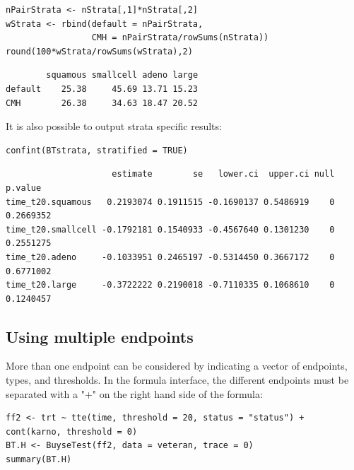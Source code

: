 \documentclass[12pt]{article}
\begin{document}
\lstset{language=r,label= ,caption= ,captionpos=b,numbers=none}
\begin{lstlisting}
nPairStrata <- nStrata[,1]*nStrata[,2]
wStrata <- rbind(default = nPairStrata,
                 CMH = nPairStrata/rowSums(nStrata)) 
round(100*wStrata/rowSums(wStrata),2)
\end{lstlisting}

\begin{verbatim}
        squamous smallcell adeno large
default    25.38     45.69 13.71 15.23
CMH        26.38     34.63 18.47 20.52
\end{verbatim}


It is also possible to output strata specific results:
\lstset{language=r,label= ,caption= ,captionpos=b,numbers=none}
\begin{lstlisting}
confint(BTstrata, stratified = TRUE)
\end{lstlisting}

\begin{verbatim}
                     estimate        se   lower.ci  upper.ci null   p.value
time_t20.squamous   0.2193074 0.1911515 -0.1690137 0.5486919    0 0.2669352
time_t20.smallcell -0.1792181 0.1540933 -0.4567640 0.1301230    0 0.2551275
time_t20.adeno     -0.1033951 0.2465197 -0.5314450 0.3667172    0 0.6771002
time_t20.large     -0.3722222 0.2190018 -0.7110335 0.1068610    0 0.1240457
\end{verbatim}


\clearpage



\subsection{Using multiple endpoints}
\label{sec:org741ba6e}
More than one endpoint can be considered by indicating a vector of
endpoints, types, and thresholds. In the formula interface, the
different endpoints must be separated with a "+" on the right hand
side of the formula:
\lstset{language=r,label= ,caption= ,captionpos=b,numbers=none}
\begin{lstlisting}
ff2 <- trt ~ tte(time, threshold = 20, status = "status") + cont(karno, threshold = 0)
BT.H <- BuyseTest(ff2, data = veteran, trace = 0)
summary(BT.H)
\end{lstlisting}
\end{document}
